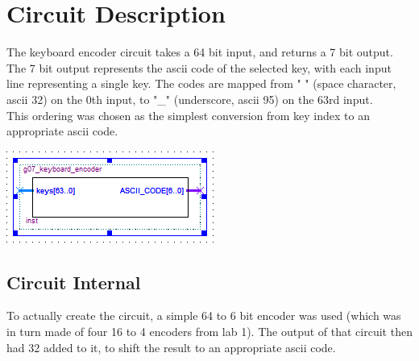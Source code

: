 \documentclass[report2]{subfiles}
\begin{document}
\section{Circuit Description}
The keyboard encoder circuit takes a 64 bit input, and returns a 7 bit output. The 7 bit output represents the ascii code of the selected key, with each input line representing a single key. The codes are mapped from " " (space character, ascii 32) on the 0th input, to "\_" (underscore, ascii 95) on the 63rd input. \\
This ordering was chosen as the simplest conversion from key index to an appropriate ascii code. \\
\begin{center}
	\includegraphics{keyboard_encode_symbol}
\end{center}
\subsection{Circuit Internal}
To actually create the circuit, a simple 64 to 6 bit encoder was used (which was in turn made of four 16 to 4 encoders from lab 1). The output of that circuit then had 32 added to it, to shift the result to an appropriate ascii code.
\end{document}

